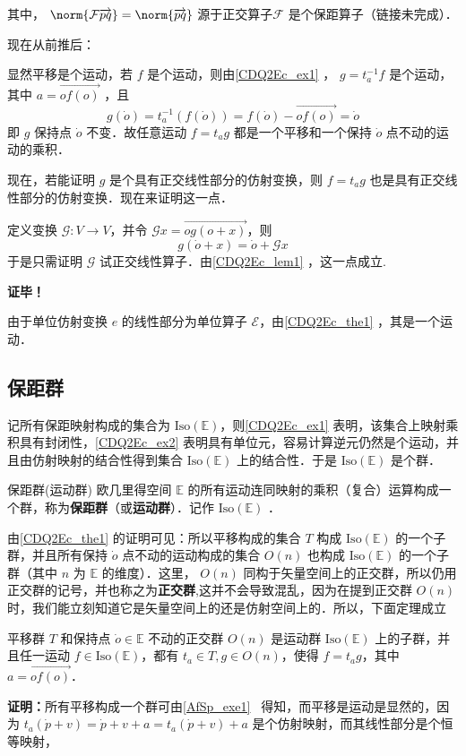 其中， $\norm{\mathcal F\overrightarrow{pq}}=\norm{\overrightarrow{pq}}$ 源于正交算子$\mathcal F$ 是个保距算子（链接未完成）．

现在从前推后：

显然平移是个运动，若 $f$ 是个运动，则由\autoref{CDQ2Ec_ex1} ， $g=t_a^{-1} f$ 是个运动，其中 $a=\overrightarrow{of(o)}$ ，且
\begin{equation}
g(\dot o)=t_a^{-1}(f(\dot o))=f(\dot o)-\overrightarrow{of(o)}=\dot o
\end{equation}
即 $g$ 保持点 $\dot o$ 不变．故任意运动 $f=t_ag$ 都是一个平移和一个保持 $\dot o$ 点不动的运动的乘积．

现在，若能证明 $g$ 是个具有正交线性部分的仿射变换，则 $f=t_a g$ 也是具有正交线性部分的仿射变换．现在来证明这一点．

定义变换 $\mathcal G:V\rightarrow V$，并令 $\mathcal G x=\overrightarrow{og(o+x)}$，则
\begin{equation}\label{CDQ2Ec_eq1}
g(\dot o+x)=\dot o+\mathcal G x
\end{equation}
于是只需证明 $\mathcal G$ 试正交线性算子．由\autoref{CDQ2Ec_lem1} ，这一点成立.

\textbf{证毕！}
\begin{example}{}\label{CDQ2Ec_ex2}
由于单位仿射变换 $e$ 的线性部分为单位算子 $\mathcal E$，由\autoref{CDQ2Ec_the1} ，其是一个运动．
\end{example}
\subsection{保距群}
记所有保距映射构成的集合为 $\mathrm{Iso(\mathbb E)}$，则\autoref{CDQ2Ec_ex1} 表明，该集合上映射乘积具有封闭性，\autoref{CDQ2Ec_ex2} 表明具有单位元，容易计算逆元仍然是个运动，并且由仿射映射的结合性得到集合 $\mathrm{Iso(\mathbb E)}$ 上的结合性．于是 $\mathrm{Iso}(\mathbb E)$ 是个群．
\begin{definition}{保距群(运动群)}
欧几里得空间 $\mathbb E$ 的所有运动连同映射的乘积（复合）运算构成一个群，称为\textbf{保距群}（或\textbf{运动群}）．记作 $\mathrm{Iso(\mathbb E)}$ ．
\end{definition}
由\autoref{CDQ2Ec_the1} 的证明可见：所以平移构成的集合 $T$ 构成 $\mathrm{Iso}(\mathbb E)$ 的一个子群，并且所有保持 $\dot o$ 点不动的运动构成的集合 $O(n)$ 也构成 $\mathrm{Iso}(\mathbb E)$ 的一个子群（其中 $n$ 为 $\mathbb E$ 的维度）．这里， $O(n)$ 同构于矢量空间上的正交群，所以仍用正交群的记号，并也称之为\textbf{正交群},这并不会导致混乱，因为在提到正交群 $O(n)$ 时，我们能立刻知道它是矢量空间上的还是仿射空间上的．所以，下面定理成立
\begin{theorem}{}
平移群 $T$ 和保持点 $\dot o\in\mathbb E$ 不动的正交群 $O(n)$ 是运动群 $\mathrm{Iso(\mathbb E)}$ 上的子群，并且任一运动 $f\in\mathrm{Iso(\mathbb E)}$，都有 $t_a\in T,g\in O(n)$，使得 $f=t_ag$，其中 $a=\overrightarrow{of(o)}$．
\end{theorem}
\textbf{证明：}所有平移构成一个群可由\autoref{AfSp_exe1}~ 得知，而平移是运动是显然的，因为 $t_a(\dot p+v)=\dot p+v+a=t_a(\dot p+v)+a$ 是个仿射映射，而其线性部分是个恒等映射，